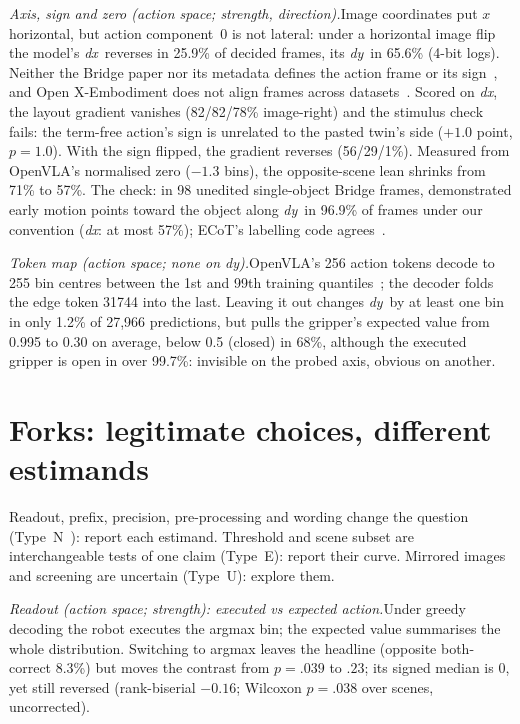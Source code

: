 \documentclass[conference]{IEEEtran}
\newcommand{\dy}{\textit{dy}}
\newcommand{\dx}{\textit{dx}}
\newcommand{\head}[1]{\textit{#1}\hspace{0.4em}}
\begin{document}
\head{Axis, sign and zero (action space; strength, direction).}Image coordinates put $x$ horizontal, but action component~0 is not lateral: under a horizontal image flip the model's \dx\ reverses in 25.9\% of decided frames, its \dy\ in 65.6\% (4-bit logs). Neither the Bridge paper nor its metadata defines the action frame or its sign~\cite{walke2023bridgedata}, and Open X-Embodiment does not align frames across datasets~\cite{oneill2024open}. Scored on \dx, the layout gradient vanishes (82/82/78\% image-right) and the stimulus check fails: the term-free action's sign is unrelated to the pasted twin's side ($+1.0$ point, $p=1.0$). With the sign flipped, the gradient reverses (56/29/1\%). Measured from OpenVLA's normalised zero ($-1.3$ bins), the opposite-scene lean shrinks from 71\% to 57\%. The check: in 98 unedited single-object Bridge frames, demonstrated early motion points toward the object along \dy\ in 96.9\% of frames under our convention (\dx: at most 57\%); ECoT's labelling code agrees~\cite{zawalski2024robotic}.

\head{Token map (action space; none on \dy).}OpenVLA's 256 action tokens decode to 255 bin centres between the 1st and 99th training quantiles~\cite{kim2024openvla}; the decoder folds the edge token 31744 into the last. Leaving it out changes \dy\ by at least one bin in only 1.2\% of 27,966 predictions, but pulls the gripper's expected value from 0.995 to 0.30 on average, below 0.5 (closed) in 68\%, although the executed gripper is open in over 99.7\%: invisible on the probed axis, obvious on another.

\section{Forks: legitimate choices, different estimands}
\label{sec:forks}

Readout, prefix, precision, pre-processing and wording change the question (Type~N~\cite{delgiudice2021travelers}): report each estimand. Threshold and scene subset are interchangeable tests of one claim (Type~E): report their curve. Mirrored images and screening are uncertain (Type~U): explore them.

\head{Readout (action space; strength): executed vs expected action.}Under greedy decoding the robot executes the argmax bin; the expected value summarises the whole distribution. Switching to argmax leaves the headline (opposite both-correct 8.3\%) but moves the contrast from $p=.039$ to $.23$; its signed median is 0, yet still reversed (rank-biserial $-0.16$; Wilcoxon $p=.038$ over scenes, uncorrected).
\end{document}
